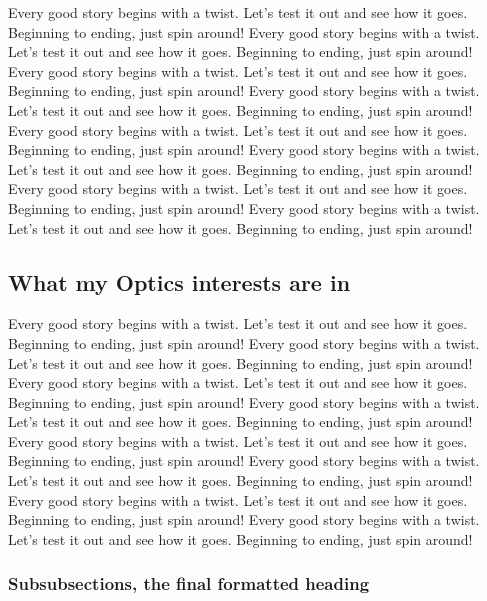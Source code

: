 Every good story begins with a twist. Let's test it out and see how it goes. Beginning to ending, just spin around! Every good story begins with a twist. Let's test it out and see how it goes. Beginning to ending, just spin around! Every good story begins with a twist. Let's test it out and see how it goes. Beginning to ending, just spin around! Every good story begins with a twist. Let's test it out and see how it goes. Beginning to ending, just spin around! Every good story begins with a twist. Let's test it out and see how it goes. Beginning to ending, just spin around! Every good story begins with a twist. Let's test it out and see how it goes. Beginning to ending, just spin around! Every good story begins with a twist. Let's test it out and see how it goes. Beginning to ending, just spin around! Every good story begins with a twist. Let's test it out and see how it goes. Beginning to ending, just spin around!

\subsection{What my Optics interests are in}

Every good story begins with a twist. Let's test it out and see how it goes. Beginning to ending, just spin around! Every good story begins with a twist. Let's test it out and see how it goes. Beginning to ending, just spin around! Every good story begins with a twist. Let's test it out and see how it goes. Beginning to ending, just spin around! Every good story begins with a twist. Let's test it out and see how it goes. Beginning to ending, just spin around! Every good story begins with a twist. Let's test it out and see how it goes. Beginning to ending, just spin around! Every good story begins with a twist. Let's test it out and see how it goes. Beginning to ending, just spin around! Every good story begins with a twist. Let's test it out and see how it goes. Beginning to ending, just spin around! Every good story begins with a twist. Let's test it out and see how it goes. Beginning to ending, just spin around!

\subsubsection{Subsubsections, the final formatted heading}

